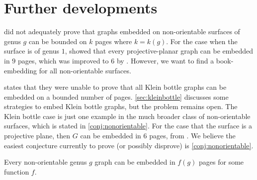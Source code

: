 
\section{Further developments}

\textcite{heathPagenumberGenusGraphs1992} did not adequately prove that graphs embedded on non-orientable surfaces of genus $g$ can be bounded on $k$ pages where $k = k(g)$. For the case when the surface is of genus $1$, \textcite{nakamotoBookEmbeddingProjectiveplanar2015} showed that every projective-planar graph can be embedded in $9$ pages, which was improved to 6 by \textcite{ozekiBookEmbeddingGraphs2019}. However, we want to find a book-embedding for all non-orientable surfaces. 

\textcite{ozekiBookEmbeddingGraphs2019} states that they were unable to prove that all Klein bottle graphs can be embedded on a bounded number of pages. \cref{sec:kleinbottle} discusses some strategies to embed Klein bottle graphs, but the problem remains open. The Klein bottle case is just one example in the much broader class of non-orientable surfaces, which is stated in \cref{conj:nonorientable}. For the case that the surface is a projective plane, then $G$ can be embedded in 6 pages, from \textcite{ozekiBookEmbeddingGraphs2019}. We believe the easiest conjecture currently to prove (or possibly disprove) is \cref{conj:nonorientable}. 
\begin{conjecture}\label{conj:nonorientable}
	Every non-orientable genus $g$ graph can be embedded in $f(g)$ pages for some function $f$. 
\end{conjecture}